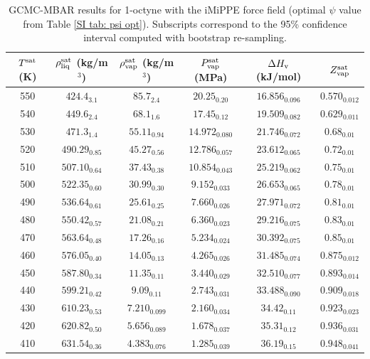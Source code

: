\documentclass[journal=jctc,manuscript=article]{achemso}
\begin{document}
\begin{table}[htb!]
	\caption{GCMC-MBAR results for 1-octyne with the iMiPPE force field (optimal $\psi$ value from Table \ref{SI tab: psi opt}). Subscripts correspond to the 95\% confidence interval computed with bootstrap re-sampling.}
	\begin{center}
		\begin{tabular}{|c|c|c|c|c|c|}
			\hline
			$T^{\rm sat}$ (K) & $\rho_{\rm liq}^{\rm sat}$ (kg/m$^3$) & $\rho_{\rm vap}^{\rm sat}$ (kg/m$^3$) & $P_{\rm vap}^{\rm sat}$ (MPa) & $\Delta H_{\rm v}$ (kJ/mol) & $Z_{\rm vap}^{\rm sat}$ \\ \hline
			550 & $424.4_{3.1}$ & $85.7_{2.4}$ & $20.25_{0.20}$ & $16.856_{0.096}$ & $0.570_{0.012}$ \\
			540 & $449.6_{2.4}$ & $68.1_{1.6}$ & $17.45_{0.12}$ & $19.509_{0.082}$ & $0.629_{0.011}$ \\
			530 & $471.3_{1.4}$ & $55.11_{0.94}$ & $14.972_{0.080}$ & $21.746_{0.072}$ & $0.68_{0.01}$ \\
			520 & $490.29_{0.85}$ & $45.27_{0.56}$ & $12.786_{0.057}$ & $23.612_{0.065}$ & $0.72_{0.01}$ \\
			510 & $507.10_{0.64}$ & $37.43_{0.38}$ & $10.854_{0.043}$ & $25.219_{0.062}$ & $0.75_{0.01}$ \\
			500 & $522.35_{0.60}$ & $30.99_{0.30}$ & $9.152_{0.033}$ & $26.653_{0.065}$ & $0.78_{0.01}$ \\
			490 & $536.64_{0.61}$ & $25.61_{0.25}$ & $7.660_{0.026}$ & $27.971_{0.072}$ & $0.81_{0.01}$ \\
			480 & $550.42_{0.57}$ & $21.08_{0.21}$ & $6.360_{0.023}$ & $29.216_{0.075}$ & $0.83_{0.01}$ \\
			470 & $563.64_{0.48}$ & $17.26_{0.16}$ & $5.234_{0.024}$ & $30.392_{0.075}$ & $0.85_{0.01}$ \\
			460 & $576.05_{0.40}$ & $14.05_{0.13}$ & $4.265_{0.026}$ & $31.485_{0.074}$ & $0.875_{0.012}$ \\
			450 & $587.80_{0.34}$ & $11.35_{0.11}$ & $3.440_{0.029}$ & $32.510_{0.077}$ & $0.893_{0.014}$ \\
			440 & $599.21_{0.42}$ & $9.09_{0.11}$ & $2.743_{0.031}$ & $33.488_{0.090}$ & $0.909_{0.018}$ \\
			430 & $610.23_{0.53}$ & $7.210_{0.099}$ & $2.160_{0.034}$ & $34.42_{0.11}$ & $0.923_{0.023}$ \\
			420 & $620.82_{0.50}$ & $5.656_{0.089}$ & $1.678_{0.037}$ & $35.31_{0.12}$ & $0.936_{0.031}$ \\
			410 & $631.54_{0.36}$ & $4.383_{0.076}$ & $1.285_{0.039}$ & $36.19_{0.15}$ & $0.948_{0.041}$ \\
			\hline
		\end{tabular}
	\end{center}
\end{table}
\end{document}
